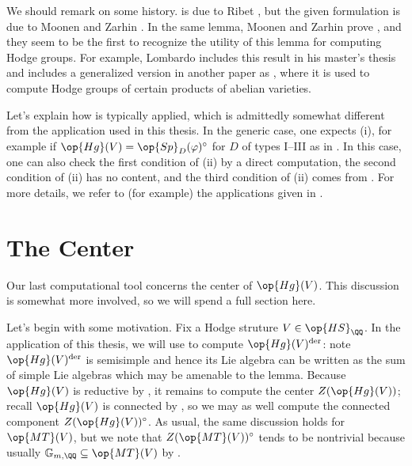 \documentclass[../thesis.tex]{subfiles}
\begin{document}
\begin{remark}
	We should remark on some history.  is due to Ribet \cite[pp.~790--791]{ribet-galois-action-rm}, but the given formulation is due to Moonen and Zarhin \cite[Lemma~2.14]{moonen-zarhin-fourfold}. In the same lemma, Moonen and Zarhin prove , and they seem to be the first to recognize the utility of this lemma for computing Hodge groups. For example, Lombardo includes this result in his master's thesis \cite[Lemma~3.3.1]{lombardo-mumford-tate} and includes a generalized version in another paper as \cite[Lemma~3.7]{lombardo-ell-adic-product}, where it is used to compute Hodge groups of certain products of abelian varieties.
\end{remark}
\begin{remark}
	Let's explain how  is typically applied, which is admittedly somewhat different from the application used in this thesis. In the generic case, one expects (i), for example if $\op{Hg}(V)=\op{Sp}_D(\varphi)^\circ$ for $D$ of types I--III as in . In this case, one can also check the first condition of (ii) by a direct computation, the second condition of (ii) has no content, and the third condition of (ii) comes from . For more details, we refer to (for example) the applications given in \cite{lombardo-mumford-tate,lombardo-ell-adic-product}.
\end{remark}

\section{The Center}
Our last computational tool concerns the center of $\op{Hg}(V)$. This discussion is somewhat more involved, so we will spend a full section here.

Let's begin with some motivation. Fix a Hodge struture $V\in\op{HS}_\QQ$. In the application of this thesis, we will use  to compute $\op{Hg}(V)^{\mathrm{der}}$: note $\op{Hg}(V)^{\mathrm{der}}$ is semisimple and hence its Lie algebra can be written as the sum of simple Lie algebras which may be amenable to the lemma. Because $\op{Hg}(V)$ is reductive by , it remains to compute the center $Z(\op{Hg}(V))$; recall $\op{Hg}(V)$ is connected by , so we may as well compute the connected component $Z(\op{Hg}(V))^\circ$. As usual, the same discussion holds for $\op{MT}(V)$, but we note that $Z(\op{MT}(V))^\circ$ tends to be nontrivial because usually $\mathbb G_{m,\QQ}\subseteq\op{MT}(V)$ by .
\end{document}
